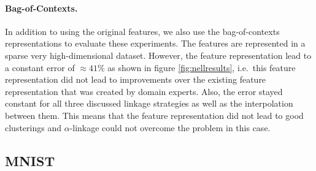 \begin{table}[H]
  \caption{Proposed Subcategories for ``Kitchen Item''.}
  \label{tbl:kitchenitems}
\end{table}

\paragraph{Bag-of-Contexts.} In addition to using the original features, we also use the bag-of-contexts representations to evaluate these experiments. The features are represented in a sparse very high-dimensional dataset. However, the feature representation lead to a constant error of $\approx 41\%$ as shown in figure \ref{fig:nellresults}, i.e.\ this feature representation did not lead to improvements over the existing feature representation that was created by domain experts. Also, the error stayed constant for all three discussed linkage strategies as well as the interpolation between them. This means that the feature representation did not lead to good clusterings and $\alpha$-linkage could not overcome the problem in this case.

\subsection{MNIST}

